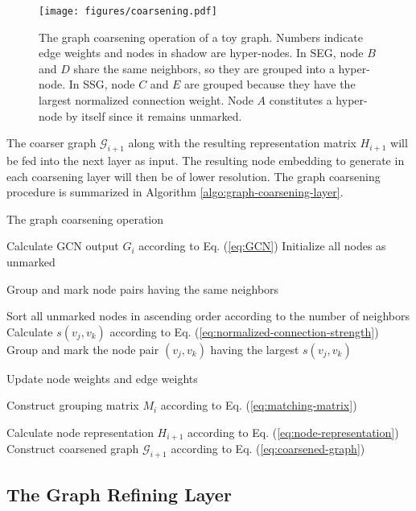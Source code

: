 \documentclass{article}
\begin{document}
\begin{figure}
	\centering
	\texttt{[image: figures/coarsening.pdf]}
	\caption{The graph coarsening operation of a toy graph. Numbers indicate edge weights and nodes in shadow are hyper-nodes. In SEG, node $B$ and $D$ share the same neighbors, so they are grouped into a hyper-node. In SSG, node $C$ and $E$ are grouped because they have the largest normalized connection weight. Node $A$ constitutes a hyper-node by itself since it remains unmarked.}
	\label{fig:coarsening}
\end{figure}

The coarser graph $\mathcal{G}_{i+1}$ along with the resulting representation matrix $H_{i+1}$ will be fed into the next layer as input. The resulting node embedding to generate in each coarsening layer will then be of lower resolution. The graph coarsening procedure is summarized in Algorithm \ref{algo:graph-coarsening-layer}.

\begin{algorithm}
	\caption{The graph coarsening operation}
	\label{algo:graph-coarsening-layer}
	
	Calculate GCN output $G_i$ according to Eq. (\ref{eq:GCN})\;
	Initialize all nodes as unmarked\;
	
	Group and mark node pairs having the same neighbors\;
	
	Sort all unmarked nodes in ascending order according to the number of neighbors\;
	 {
		 {
			 {
				Calculate $s(v_j, v_k)$ according to Eq. (\ref{eq:normalized-connection-strength})\;
			}
			Group and mark the node pair $(v_j, v_k)$ having the largest $s(v_j, v_k)$\;
		}
	}
	
	Update node weights and edge weights\;
	
	Construct grouping matrix $M_i$ according to Eq. (\ref{eq:matching-matrix})\;
	
	Calculate node representation $H_{i+1}$ according to Eq. (\ref{eq:node-representation})\;
	Construct coarsened graph $\mathcal{G}_{i+1}$ according to Eq. (\ref{eq:coarsened-graph})\;
\end{algorithm}

\subsection{The Graph Refining Layer}
\end{document}
